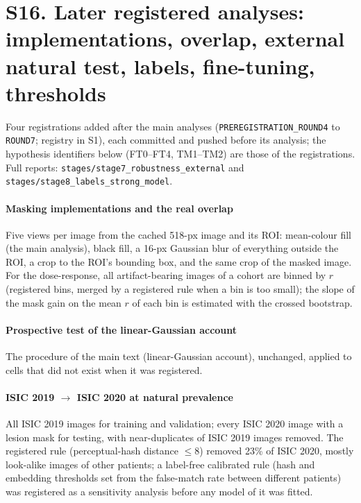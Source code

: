 \documentclass[review,3p]{elsarticle}
\begin{document}
\section*{S16. Later registered analyses: implementations, overlap, external natural test, labels, fine-tuning, thresholds}\label{supp:S16}
Four registrations added after the main analyses (\texttt{PREREGISTRATION\_ROUND4} to \texttt{ROUND7}; registry in S1),
each committed and pushed before its analysis; the hypothesis identifiers below (FT0--FT4, TM1--TM2) are those of the
registrations. Full reports: \texttt{stages/stage7\_robustness\_external} and \texttt{stages/stage8\_labels\_strong\_model}.

\paragraph{Masking implementations and the real overlap} Five views per image from the cached 518-px image and its
ROI: mean-colour fill (the main analysis), black fill, a 16-px Gaussian blur of everything outside the ROI, a crop to the
ROI's bounding box, and the same crop of the masked image. For the dose-response, all artifact-bearing images of a cohort
are binned by $r$ (registered bins, merged by a registered rule when a bin is too small); the slope of the mask gain on
the mean $r$ of each bin is estimated with the crossed bootstrap.



\paragraph{Prospective test of the linear-Gaussian account} The procedure of the main text (linear-Gaussian account), unchanged, applied
to cells that did not exist when it was registered.

\paragraph{ISIC 2019 $\to$ ISIC 2020 at natural prevalence} All ISIC 2019 images for training and validation; every ISIC
2020 image with a lesion mask for testing, with near-duplicates of ISIC 2019 images removed. The registered rule
(perceptual-hash distance $\le8$) removed 23\% of ISIC 2020, mostly look-alike images of other patients; a label-free
calibrated rule (hash and embedding thresholds set from the false-match rate between different patients) was registered
as a sensitivity analysis before any model of it was fitted.


\end{document}
